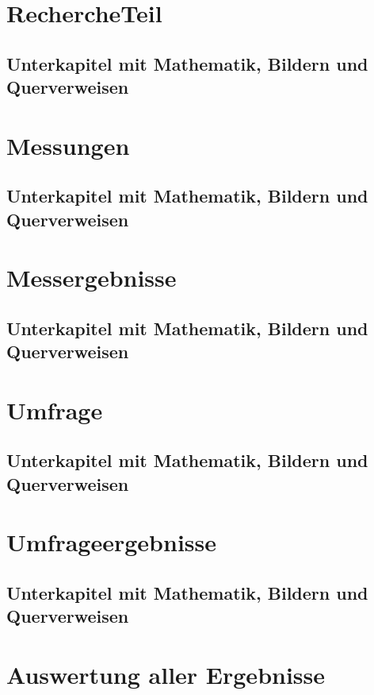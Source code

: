 \chapter{RechercheTeil}

\section{Unterkapitel mit Mathematik, Bildern und Querverweisen}

\chapter{Messungen}

\section{Unterkapitel mit Mathematik, Bildern und Querverweisen}

\chapter{Messergebnisse}

\section{Unterkapitel mit Mathematik, Bildern und Querverweisen}

\chapter{Umfrage}

\section{Unterkapitel mit Mathematik, Bildern und Querverweisen}

\chapter{Umfrageergebnisse}

\section{Unterkapitel mit Mathematik, Bildern und Querverweisen}

\chapter{Auswertung aller Ergebnisse}


